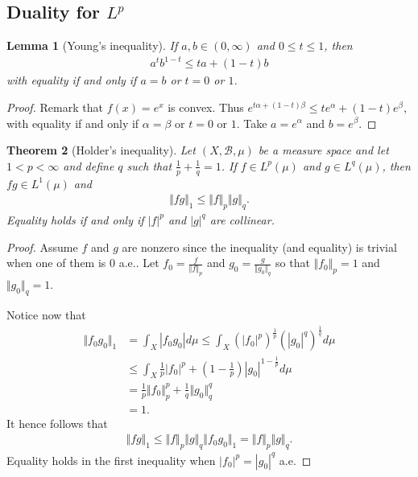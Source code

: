 \documentclass[11pt]{amsart}
\newtheorem{theorem}{Theorem}[section]
\newtheorem{lemma}[theorem]{Lemma}
\theoremstyle{definition}
\numberwithin{equation}{section}
\begin{document}
\subsection{Duality for \texorpdfstring{$L^p$}{Lp}}
\begin{lemma}[Young's inequality]
    If $a,b\in (0,\infty)$ and $0\le t\le 1$, then
    \begin{align*}
        a^tb^{1-t}\le ta+(1-t)b
    \end{align*}
    with equality if and only if $a=b$ or $t=0$ or $1$.
\end{lemma}
\begin{proof}
    Remark that $f(x)=e^x$ is convex. Thus $e^{t\alpha+(1-t)\beta}\le te^\alpha+(1-t)e^\beta$, with equality if and only if $\alpha=\beta$ or $t=0$ or $1$. Take $a=e^\alpha$ and $b=e^\beta$.
\end{proof}
\begin{theorem}[Holder's inequality]
    Let $(X,\mathcal B,\mu)$ be a measure space and let $1<p<\infty$ and define $q$ such that $\frac{1}{p}+\frac{1}{q}=1$. If $f\in L^p(\mu)$ and $g\in L^q(\mu)$, then $fg\in L^1(\mu)$ and
    \begin{align*}
        \Vert fg\Vert_1\le \Vert f\Vert_p\Vert g\Vert_q.
    \end{align*}
    Equality holds if and only if $|f|^p$ and $|g|^q$ are collinear.
\end{theorem}
\begin{proof}
    Assume $f$ and $g$ are nonzero since the inequality (and equality) is trivial when one of them is 0 a.e.. Let $f_0=\frac{f}{\Vert f\Vert_p}$ and $g_0=\frac{g}{\Vert g_0\Vert_q}$ so that $\Vert f_0\Vert_p=1$ and $\Vert g_0\Vert_q=1$.

    Notice now that
    \begin{align*}
        \Vert f_0g_0\Vert_1&=\int_X|f_0g_0|d\mu\le\int_X(|f_0|^p)^\frac{1}{p}(|g_0|^q)^\frac{1}{q}d\mu\\
        &\le\int_X\frac{1}{p}|f_0|^p+(1-\frac{1}{p})|g_0|^{1-\frac{1}{p}}d\mu\\
        &=\frac{1}{p}\Vert f_0\Vert_p^p+\frac{1}{q}\Vert g_0\Vert_q^q\\
        &=1.
    \end{align*}
    It hence follows that
    \begin{align*}
        \Vert fg\Vert_1\le\Vert f\Vert_p\Vert g\Vert_q\Vert f_0g_0\Vert_1=\Vert f\Vert_p\Vert g\Vert_q.
    \end{align*}
    Equality holds in the first inequality when $|f_0|^p=|g_0|^q$ a.e.
\end{proof}
\end{document}
